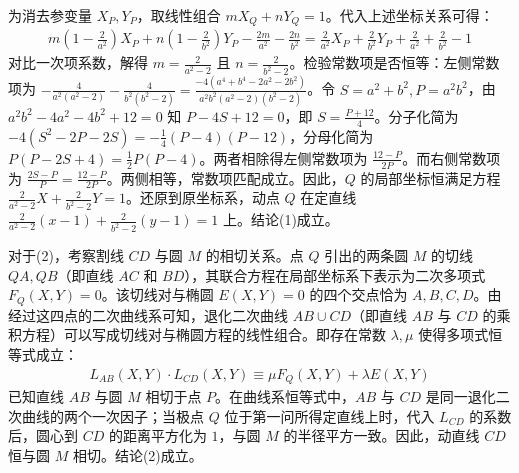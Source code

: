 \begin{solution}
为消去参变量 $X_P, Y_P$，取线性组合 $m X_Q + n Y_Q = 1$。代入上述坐标关系可得：
\begin{align*}
m\left(1 - \frac{2}{a^2}\right) X_P + n\left(1 - \frac{2}{b^2}\right) Y_P - \frac{2m}{a^2} - \frac{2n}{b^2} = \frac{2}{a^2} X_P + \frac{2}{b^2} Y_P + \frac{2}{a^2} + \frac{2}{b^2} - 1
\end{align*}
对比一次项系数，解得 $m = \frac{2}{a^2 - 2}$ 且 $n = \frac{2}{b^2 - 2}$。检验常数项是否恒等：左侧常数项为 $-\frac{4}{a^2(a^2-2)} - \frac{4}{b^2(b^2-2)} = \frac{-4(a^4+b^4-2a^2-2b^2)}{a^2b^2(a^2-2)(b^2-2)}$。令 $S = a^2+b^2, P = a^2b^2$，由 $a^2b^2 - 4a^2 - 4b^2 + 12 = 0$ 知 $P - 4S + 12 = 0$，即 $S = \frac{P+12}{4}$。分子化简为 $-4(S^2 - 2P - 2S) = -\frac{1}{4}(P-4)(P-12)$，分母化简为 $P(P - 2S + 4) = \frac{1}{2}P(P-4)$。两者相除得左侧常数项为 $\frac{12-P}{2P}$。而右侧常数项为 $\frac{2S - P}{P} = \frac{12-P}{2P}$。两侧相等，常数项匹配成立。因此，$Q$ 的局部坐标恒满足方程 $\frac{2}{a^2 - 2} X + \frac{2}{b^2 - 2} Y = 1$。还原到原坐标系，动点 $Q$ 在定直线 $\frac{2}{a^2 - 2} (x-1) + \frac{2}{b^2 - 2} (y-1) = 1$ 上。结论(1)成立。

对于(2)，考察割线 $CD$ 与圆 $M$ 的相切关系。点 $Q$ 引出的两条圆 $M$ 的切线 $QA, QB$（即直线 $AC$ 和 $BD$），其联合方程在局部坐标系下表示为二次多项式 $F_Q(X, Y) = 0$。该切线对与椭圆 $E(X,Y) = 0$ 的四个交点恰为 $A, B, C, D$。由经过这四点的二次曲线系可知，退化二次曲线 $AB \cup CD$（即直线 $AB$ 与 $CD$ 的乘积方程）可以写成切线对与椭圆方程的线性组合。即存在常数 $\lambda, \mu$ 使得多项式恒等式成立：
\begin{align*}
L_{AB}(X, Y) \cdot L_{CD}(X, Y) \equiv \mu F_Q(X, Y) + \lambda E(X, Y)
\end{align*}
已知直线 $AB$ 与圆 $M$ 相切于点 $P$。在曲线系恒等式中，$AB$ 与 $CD$ 是同一退化二次曲线的两个一次因子；当极点 $Q$ 位于第一问所得定直线上时，代入 $L_{CD}$ 的系数后，圆心到 $CD$ 的距离平方化为 $1$，与圆 $M$ 的半径平方一致。因此，动直线 $CD$ 恒与圆 $M$ 相切。结论(2)成立。
\end{solution}

